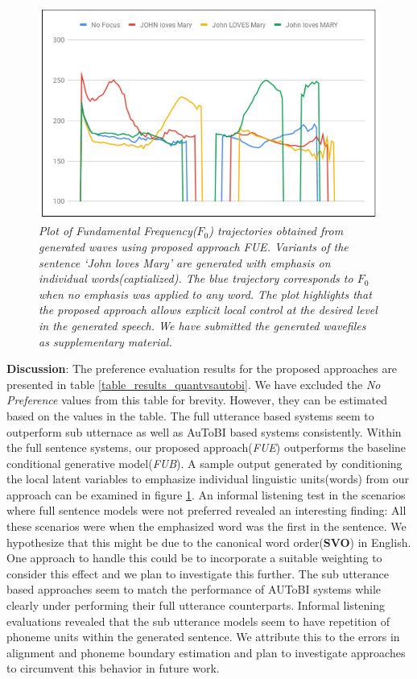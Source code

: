 \begin{figure}[t]
\centering
\includegraphics[scale=0.25]{images/f0_manipulation.png}
\caption{\textit{Plot of Fundamental Frequency($F_0$) trajectories obtained from generated waves using proposed approach \textit{FUE}. Variants of the sentence `John loves Mary' are generated with emphasis on individual words(captialized). The blue trajectory corresponds to $F_0$ when no emphasis was applied to any word. The plot highlights that the proposed approach allows explicit local control at the desired level in the generated speech. We have submitted the generated wavefiles as supplementary material.}} 
\label{plot_overview}
\end{figure}  



\textbf{Discussion}: The preference evaluation results for the proposed approaches are presented in table \ref{table_results_quantvsautobi}.  We have excluded the \textit{No Preference} values from this table for brevity. However, they can be estimated based on the values in the table. The full utterance based systems seem to outperform sub utternace as well as AuToBI based systems consistently. Within the full sentence systems,  our proposed approach(\textit{FUE}) outperforms the baseline conditional generative model(\textit{FUB}). A sample output generated by conditioning the local latent variables to emphasize individual linguistic units(words) from our approach can be examined in figure \ref{plot_overview}. An informal listening test in the scenarios where full sentence models were not preferred revealed an interesting finding: All these scenarios were when the emphasized word was the first in the sentence. We hypothesize that this might be due to the canonical word order(\textbf{SVO}) in English. One approach to handle this could be to incorporate a suitable weighting to consider this effect and we plan to investigate this further.  The sub utterance based approaches seem to match the performance of AUToBI systems while clearly under performing their full utterance counterparts. Informal listening evaluations revealed that the sub utterance models seem to have repetition of phoneme units within the generated sentence. We attribute this to the errors in alignment and phoneme boundary estimation and plan to investigate approaches to circumvent this behavior in future work. 


